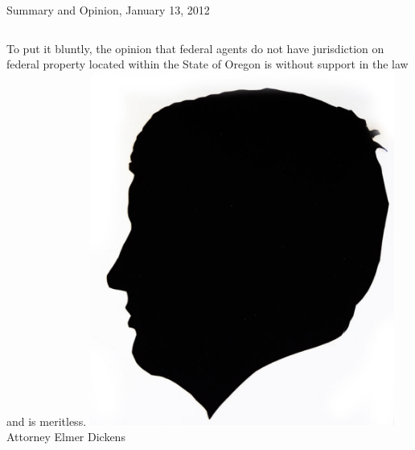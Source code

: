 \documentclass{beamer}
\begin{document}
\begin{frame}{Summary and Opinion, January 13, 2012}
    \begin{columns}[onlytextwidth]
To put it bluntly, the opinion that federal agents do not have jurisdiction on federal property located within the State of Oregon is without support in the law and is meritless.
            \centering
            \includegraphics[width=0.75\textwidth]{img/elmer-dickens.png}
            \\ Attorney Elmer Dickens \\
    \end{columns}
\end{frame}

\def\braces#1{[#1]}
\end{document}
